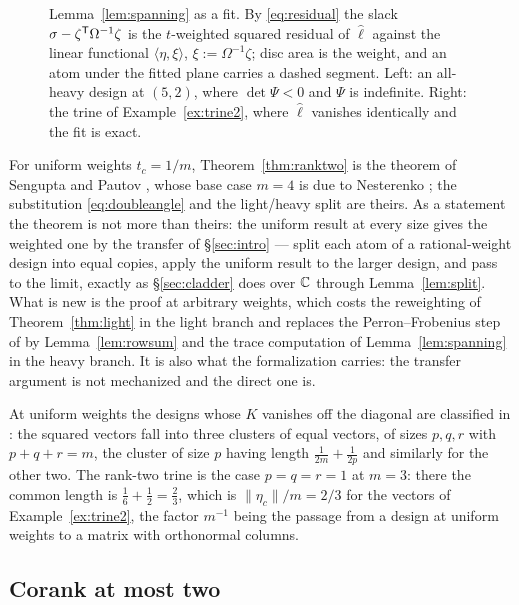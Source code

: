 \begin{figure}[ht]
  \centering
  
  \caption{Lemma~\ref{lem:spanning} as a fit.  By \eqref{eq:residual} the
  slack $\sigma-\zeta^{\mathsf{T}}\Omega^{-1}\zeta$ is the $t$-weighted squared
  residual of $\hat\ell$ against the linear functional
  $\langle\eta,\xi\rangle$, $\xi:=\Omega^{-1}\zeta$; disc area is the
  weight, and an atom under the fitted plane carries a dashed segment.
  Left: an all-heavy design at $(5,2)$, where $\det\Psi<0$ and $\Psi$ is
  indefinite.
  Right: the trine of Example~\ref{ex:trine2}, where $\hat\ell$ vanishes
  identically and the fit is exact.}
  \label{fig:regression}
\end{figure}

For uniform weights $t_c=1/m$, Theorem~\ref{thm:ranktwo} is the theorem of
Sengupta and Pautov \cite{SenguptaPautov2026}, whose base case $m=4$ is
due to Nesterenko \cite{Nesterenko2023}; the substitution
\eqref{eq:doubleangle} and the light/heavy split are theirs.  As a
statement the theorem is not more than theirs: the uniform result at every
size gives the weighted one by the transfer of \S\ref{sec:intro} --- split
each atom of a rational-weight design into equal copies, apply the uniform
result to the larger design, and pass to the limit, exactly as
\S\ref{sec:cladder} does over $\mathbb{C}$ through Lemma~\ref{lem:split}.  What is
new is the proof at arbitrary weights, which costs the reweighting of
Theorem~\ref{thm:light} in the light branch and replaces the
Perron--Frobenius step of \cite{SenguptaPautov2026} by
Lemma~\ref{lem:rowsum} and the trace computation of
Lemma~\ref{lem:spanning} in the heavy branch.  It is also what the
formalization carries: the transfer argument is not mechanized and the
direct one is.

At uniform weights the designs whose $K$ vanishes off the diagonal are
classified in \cite{Nesterenko2026real}: the squared vectors fall into
three clusters of equal vectors, of sizes $p,q,r$ with $p+q+r=m$, the
cluster of size $p$ having length
$\tfrac1{2m}+\tfrac1{2p}$ and similarly for the other two.  The rank-two
trine is the case $p=q=r=1$ at $m=3$: there the common length is
$\tfrac16+\tfrac12=\tfrac23$, which is $\lVert \eta_c\rVert/m=2/3$ for the
vectors of Example~\ref{ex:trine2}, the factor $m^{-1}$ being the passage
from a design at uniform weights to a matrix with orthonormal columns.

\subsection{Corank at most two}\label{sec:corank}

